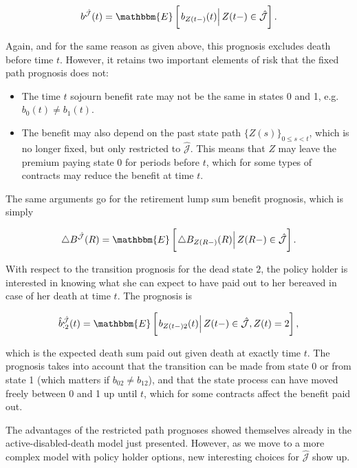 \documentclass{article}
\newcommand{\1}[1]{\mathbbm{1}_{\left\lbrace #1 \right\rbrace}}
\newcommand{\econd}[2][def]{\mathbbm{E} \left[ \left. #1 \right| #2 \right]}
\theoremstyle{break}
\theoremstyle{remark}
\numberwithin{equation}{section}
\begin{document}
\begin{align*}
    b^{\hat{\mathcal{J}}}(t) = \econd[b_{Z(t-)}(t)]{Z(t-) \in \hat{\mathcal{J}}}.
\end{align*}

Again, and for the same reason as given above, this prognosis excludes death before time $t$. However, it retains two important elements of risk that the fixed path prognosis does not:

\begin{itemize}
    \item The time $t$ sojourn benefit rate may not be the same in states 0 and 1, e.g. $b_0(t) \neq b_1(t)$.
    \item The benefit may also depend on the past state path $\{ Z(s) \}_{0 \leq s < t}$, which is no longer fixed, but only restricted to $\hat{\mathcal{J}}$. This means that $Z$ may leave the premium paying state 0 for periods before $t$, which for some types of contracts may reduce the benefit at time $t$.
\end{itemize}

The same arguments go for the retirement lump sum benefit prognosis, which is simply

\begin{align*}
\triangle B^{\hat{\mathcal{J}}}(R) = \econd[\triangle B_{Z(R-)}(R)]{Z(R-) \in \hat{\mathcal{J}}}.
\end{align*}

With respect to the transition prognosis for the dead state $2$, the policy holder is interested in knowing what she can expect to have paid out to her bereaved in case of her death at time $t$. The prognosis is

\begin{align} \label{FirstTransProg}
    \hat{b}_{\cdot 2}^{\hat{\mathcal{J}}}(t) = \econd[b_{Z(t-)2}(t)]{Z(t-) \in \hat{\mathcal{J}}, Z(t)=2},
\end{align}

which is the expected death sum paid out given death at exactly time $t$. The prognosis takes into account that the transition can be made from state 0 or from state 1 (which matters if $b_{02} \neq b_{12}$), and that the state process can have moved freely between 0 and 1 up until $t$, which for some contracts affect the benefit paid out.

\bigskip
\bigskip
\bigskip

The advantages of the restricted path prognoses showed themselves already in the active-disabled-death model just presented. However, as we move to a more complex model with policy holder options, new interesting choices for $\hat{\mathcal{J}}$ show up.
\end{document}
